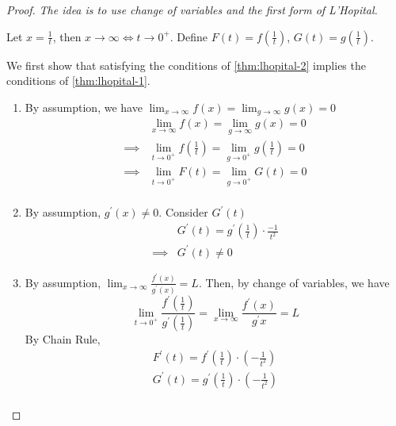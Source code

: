 \begin{proof}
    \textit{The idea is to use 
    change of variables
    and the first form of L'Hopital.
    }

    Let $x = \frac{1}{t}$, then 
    $x \to \infty \iff t \to 0^{+}$.
    Define 
    $F(t) = f \left( \frac{1}{t} \right) $,
    $G(t) = g \left( \frac{1}{t} \right) $.

    We first show that satisfying the 
    conditions of \ref{thm:lhopital-2}
    implies the conditions of 
    \ref{thm:lhopital-1}.
    \begin{enumerate}
        \item By assumption, we have 
        $\lim_{x \to \infty}f(x) = \lim_{g \to \infty}g(x) = 0$
    \begin{align*}
        &\lim_{x \to \infty}f(x) = \lim_{g \to \infty}g(x) = 0 \\
        \implies &
        \lim_{t \to 0^{+}}f \left( \frac{1}{t} \right)  = 
        \lim_{g \to 0^{+}}g \left( \frac{1}{t} \right)  = 0 \\
        \implies &
        \lim_{t \to 0^{+}}F \left( {t} \right)  = 
        \lim_{g \to 0^{+}}G \left( {t} \right)  = 0 \\
    \end{align*}
        \item By assumption, $g^{\prime}(x) \neq 0$.
        Consider $G^{\prime}(t)$
        \begin{align*}
            &G^{\prime}(t) = g^{\prime} \left( \frac{1}{t} \right) 
            \cdot \frac{-1}{t^{2}}  \\
            \implies& G^{\prime}(t) \neq 0
        \end{align*}
        \item By assumption, 
        $\lim_{x \to \infty} \frac{f^{\prime}(x)}{g^{\prime}(x)} = L$.
        Then, by change of variables, we have
        \[
            \lim_{t \to 0^{+}} 
            \frac{f^{\prime} \left( \frac{1}{t} \right) }{
                g^{\prime} \left( \frac{1}{t} \right) 
            }
            = \lim_{x \to \infty}
            \frac{f^{\prime}(x)}{g^{\prime}{x}} = L
        \]
        By Chain Rule, 
        \begin{align*}
            F^{\prime}(t) = f^{\prime} \left( \frac{1}{t} \right) 
            \cdot \left( - \frac{1}{t^{2}} \right)  \\
            G^{\prime}(t) = g^{\prime} \left( \frac{1}{t} \right) 
            \cdot \left( - \frac{1}{t^{2}} \right)  \\

\end{align*}
\end{enumerate}
\end{proof}
